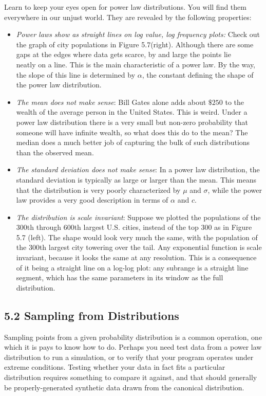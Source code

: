 \documentclass[10pt]{article}
\begin{document}
Learn to keep your eyes open for power law distributions. You will find them everywhere in our unjust world. They are revealed by the following properties:

\begin{itemize}
  \item \emph{Power laws show as straight lines on log value, log frequency plots:} Check out the graph of city populations in Figure 5.7(right). Although there are some gaps at the edges where data gets scarce, by and large the points lie\\
neatly on a line. This is the main characteristic of a power law. By the way, the slope of this line is determined by $\alpha$, the constant defining the shape of the power law distribution.
  \item \emph{The mean does not make sense}: Bill Gates alone adds about $\$ 250$ to the wealth of the average person in the United States. This is weird. Under a power law distribution there is a very small but non-zero probability that someone will have infinite wealth, so what does this do to the mean? The median does a much better job of capturing the bulk of such distributions than the observed mean.
  \item \emph{The standard deviation does not make sense}: In a power law distribution, the standard deviation is typically as large or larger than the mean. This means that the distribution is very poorly characterized by $\mu$ and $\sigma$, while the power law provides a very good description in terms of $\alpha$ and $c$.
  \item \emph{The distribution is scale invariant}: Suppose we plotted the populations of the 300th through 600th largest U.S. cities, instead of the top 300 as in Figure 5.7 (left). The shape would look very much the same, with the population of the 300th largest city towering over the tail. Any exponential function is scale invariant, because it looks the same at any resolution. This is a consequence of it being a straight line on a log-log plot: any subrange is a straight line segment, which has the same parameters in its window as the full distribution.
\end{itemize}

\subsection*{5.2 Sampling from Distributions}
Sampling points from a given probability distribution is a common operation, one which it is pays to know how to do. Perhaps you need test data from a power law distribution to run a simulation, or to verify that your program operates under extreme conditions. Testing whether your data in fact fits a particular distribution requires something to compare it against, and that should generally be properly-generated synthetic data drawn from the canonical distribution.
\end{document}

